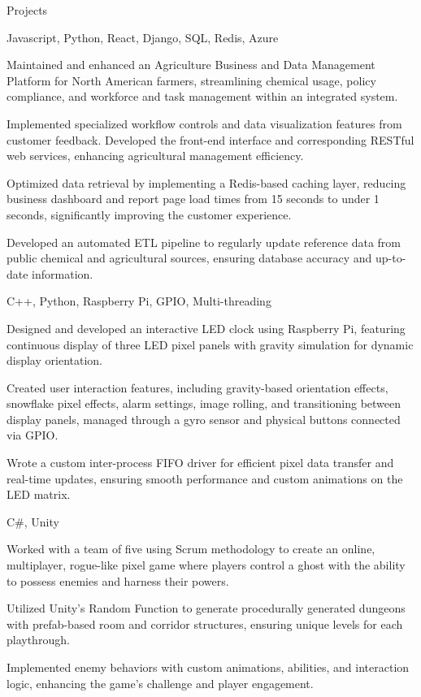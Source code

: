 \documentclass[10pt]{article}
\begin{document}
\begin{customsection}{Projects}

    {Javascript, Python, React, Django, SQL, Redis, Azure}
    {
        \item Maintained and enhanced an Agriculture Business and Data Management Platform for North American farmers, streamlining chemical usage, policy compliance, and workforce and task management within an integrated system.
        \item Implemented specialized workflow controls and data visualization features from customer feedback. Developed the front-end interface and corresponding RESTful web services, enhancing agricultural management efficiency.
        \item Optimized data retrieval by implementing a Redis-based caching layer, reducing business dashboard and report page load times from 15 seconds to under 1 seconds, significantly improving the customer experience.
        \item Developed an automated ETL pipeline to regularly update reference data from public chemical and agricultural sources, ensuring database accuracy and up-to-date information.
    }

    {C++, Python, Raspberry Pi, GPIO, Multi-threading}
    {
        \item Designed and developed an interactive LED clock using Raspberry Pi, featuring continuous display of three LED pixel panels with gravity simulation for dynamic display orientation.
        \item Created user interaction features, including gravity-based orientation effects, snowflake pixel effects, alarm settings, image rolling, and transitioning between display panels, managed through a gyro sensor and physical buttons connected via GPIO.
        \item Wrote a custom inter-process FIFO driver for efficient pixel data transfer and real-time updates, ensuring smooth performance and custom animations on the LED matrix.
    }

    {C\#, Unity}
    {
        \item Worked with a team of five using Scrum methodology to create an online, multiplayer, rogue-like pixel game where players control a ghost with the ability to possess enemies and harness their powers.
        \item Utilized Unity’s Random Function to generate procedurally generated dungeons with prefab-based room and corridor structures, ensuring unique levels for each playthrough.
        \item Implemented enemy behaviors with custom animations, abilities, and interaction logic, enhancing the game's challenge and player engagement.
    }

\end{customsection}
\end{document}
